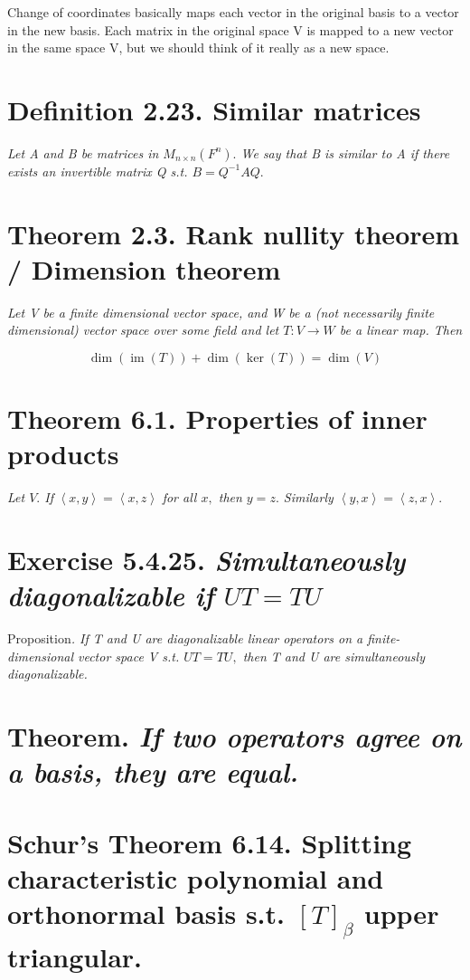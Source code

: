 \documentclass[12pt,english]{article}
\begin{document}
Change of coordinates basically maps each vector in the original basis
to a vector in the new basis. Each matrix in the original space V
is mapped to a new vector in the same space V, but we should think
of it really as a new space.

\section{Definition 2.23. Similar matrices}

\emph{Let A and B be matrices in $M_{n\times n}(F^{n}).$ We say that
B is similar to A if there exists an invertible matrix Q s.t. $B=Q^{-1}AQ.$ }

\section{Theorem 2.3. Rank nullity theorem / Dimension theorem}

\emph{Let V be a finite dimensional vector space, and W be a (not
necessarily finite dimensional) vector space over some field and let
$T:V\longrightarrow W$ be a linear map. Then}

\[
\operatorname{dim}(\operatorname{im}(T))+\operatorname{dim}(\operatorname{ker}(T))=\operatorname{dim}(V)
\]

\section{Theorem 6.1. Properties of inner products}

\emph{Let $V.$ If} $\left\langle x,y\right\rangle =\left\langle x,z\right\rangle $
\emph{for all $x,$ then $y=z.$ Similarly $\left\langle y,x\right\rangle =\left\langle z,x\right\rangle .$ }

\section{Exercise 5.4.25. \emph{Simultaneously diagonalizable if }$UT=TU$}

Proposition\emph{. If T and U are diagonalizable linear operators
on a finite-dimensional vector space V s.t. $UT=TU,$ then T and U
are simultaneously diagonalizable.}

\section{Theorem. \emph{If two operators agree on a basis, they are equal.}}

\section{Schur's Theorem 6.14. Splitting characteristic polynomial and orthonormal
basis s.t. $[T]_{\beta}$ upper triangular.}
\end{document}
